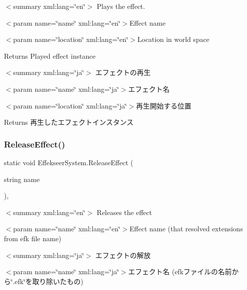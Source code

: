 $<$summary xml\+:lang=\char`\"{}en\char`\"{}$>$ Plays the effect. 

$<$param name=\char`\"{}name\char`\"{} xml\+:lang=\char`\"{}en\char`\"{}$>$Effect name

$<$param name=\char`\"{}location\char`\"{} xml\+:lang=\char`\"{}en\char`\"{}$>$Location in world space

\begin{DoxyReturn}{Returns}
Played effect instance
\end{DoxyReturn}
$<$summary xml\+:lang=\char`\"{}ja\char`\"{}$>$ エフェクトの再生 

$<$param name=\char`\"{}name\char`\"{} xml\+:lang=\char`\"{}ja\char`\"{}$>$エフェクト名

$<$param name=\char`\"{}location\char`\"{} xml\+:lang=\char`\"{}ja\char`\"{}$>$再生開始する位置

\begin{DoxyReturn}{Returns}
再生したエフェクトインスタンス
\end{DoxyReturn}
\mbox{\label{class_effekseer_system_a8b328c83692b922217657a21f9d5fdeb}} 
\subsubsection{\texorpdfstring{Release\+Effect()}{ReleaseEffect()}}
{\footnotesize\ttfamily static void Effekseer\+System.\+Release\+Effect (\begin{DoxyParamCaption}\item[{string}]{name }\end{DoxyParamCaption})\hspace{0.3cm}{\ttfamily [inline]}, {\ttfamily [static]}}

$<$summary xml\+:lang=\char`\"{}en\char`\"{}$>$ Releases the effect 

$<$param name=\char`\"{}name\char`\"{} xml\+:lang=\char`\"{}en\char`\"{}$>$Effect name (that resolved extensions from efk file name)

$<$summary xml\+:lang=\char`\"{}ja\char`\"{}$>$ エフェクトの解放 

$<$param name=\char`\"{}name\char`\"{} xml\+:lang=\char`\"{}ja\char`\"{}$>$エフェクト名 (efkファイルの名前から\char`\"{}.\+efk\char`\"{}を取り除いたもの)\mbox{\label{class_effekseer_system_af4e9eb30bd4a06ff5bc32b6ef0d020fe}} 
